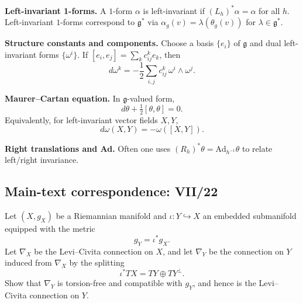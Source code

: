 \begin{solution}
\textbf{Left-invariant 1-forms.}
A $1$-form $\alpha$ is left-invariant if $(L_h)^*\alpha=\alpha$ for all $h$.
Left-invariant $1$-forms correspond to $\mathfrak g^*$ via
$\alpha_g(v)=\lambda(\theta_g(v))$ for $\lambda\in\mathfrak g^*$.

\textbf{Structure constants and components.}
Choose a basis $\{e_i\}$ of $\mathfrak g$ and dual left-invariant forms $\{\omega^i\}$.
If $[e_i,e_j]=\sum_k c_{ij}^k e_k$, then
\[
d\omega^k=-\frac12\sum_{i,j} c_{ij}^k\,\omega^i\wedge\omega^j.
\]

\textbf{Maurer--Cartan equation.}
In $\mathfrak g$-valued form,
\[
d\theta+\tfrac12[\theta,\theta]=0.
\]
Equivalently, for left-invariant vector fields $X,Y$,
\[
d\omega(X,Y)=-\omega([X,Y]).
\]

\textbf{Right translations and Ad.}
Often one uses $(R_h)^*\theta=\mathrm{Ad}_{h^{-1}}\theta$ to relate left/right invariance.
\end{solution}

\subsection*{Main-text correspondence: VII/22}

\begin{problem}
\label{prob:cp-vii-0039}
Let $(X,g_X)$ be a Riemannian manifold and $\iota:Y\hookrightarrow X$ an embedded submanifold equipped with the metric
\[
g_Y=\iota^*g_X.
\]
Let $\nabla_X$ be the Levi--Civita connection on $X$, and let $\nabla_Y$ be the connection on $Y$ induced from $\nabla_X$ by the splitting
\[
\iota^*TX = TY \oplus TY^\perp.
\]
Show that $\nabla_Y$ is torsion-free and compatible with $g_Y$, and hence is the Levi--Civita connection on $Y$.
\end{problem}

